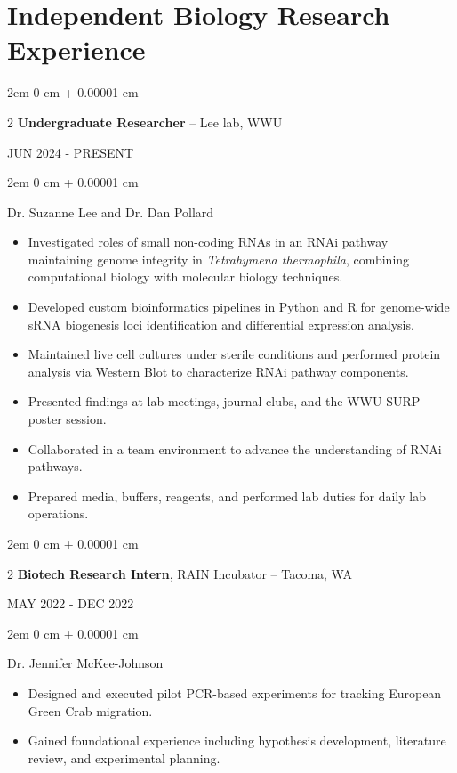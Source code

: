 \documentclass[11pt]{article}
\newcommand{\secrule}{\ \raisebox{0.5ex}{\hrulefill}}
\newcommand{\experience}[2]{%
  \begin{twocolentry}{\MakeUppercase{#2}}%
    {\fontsize{11.5pt}{13.5pt}\selectfont #1}%
  \end{twocolentry}%
}
\newenvironment{highlights}{
    \begin{itemize}[
        topsep=0.10 cm,
        parsep=0.10 cm,
        partopsep=0pt,
        itemsep=0pt,
        leftmargin=0 cm + 10pt
    ]
}{
    \end{itemize}
} %
\newenvironment{onecolentry}{
    \begin{adjustwidth}{
        2em
    }{
        0 cm + 0.00001 cm
    }
}{
    \end{adjustwidth}
} %
\newenvironment{twocolentry}[2][]{
    \onecolentry
    \def\secondColumn{#2}
    \setcolumnwidth{\fill, 5.5 cm}
    \begin{paracol}{2}
}{
    \switchcolumn \raggedleft \secondColumn
    \end{paracol}
    \endonecolentry
} %
\begin{document}
\section{Independent Biology Research Experience\secrule}

\experience{\textbf{Undergraduate Researcher} -- Lee lab, WWU}{Jun 2024 - Present}



\begin{onecolentry}
	Dr. Suzanne Lee and Dr. Dan Pollard
	\begin{highlights}
		\item Investigated roles of small non-coding RNAs in an RNAi pathway maintaining genome integrity in \textit{Tetrahymena thermophila}, combining computational biology with molecular biology techniques.
		\item Developed custom bioinformatics pipelines in Python and R for genome-wide sRNA biogenesis loci identification and differential expression analysis.
		\item Maintained live cell cultures under sterile conditions and performed protein analysis via Western Blot to characterize RNAi pathway components.
		\item Presented findings at lab meetings, journal clubs, and the WWU SURP poster session.
		\item Collaborated in a team environment to advance the understanding of RNAi pathways.
		\item Prepared media, buffers, reagents, and performed lab duties for daily lab operations.
	\end{highlights}
\end{onecolentry}




\begin{samepage}
	\experience{\textbf{Biotech Research Intern}, RAIN Incubator -- Tacoma, WA}{May 2022 - Dec 2022}
	\begin{onecolentry}
		Dr. Jennifer McKee-Johnson
		\begin{highlights}
			\item Designed and executed pilot PCR-based experiments for tracking European Green Crab migration.
			\item Gained foundational experience including hypothesis development, literature review, and experimental planning.
		\end{highlights}
	\end{onecolentry}
\end{samepage}
\end{document}
